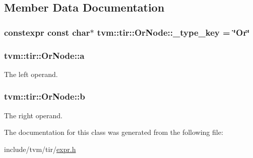 \subsection{Member Data Documentation}
\subsubsection[{\texorpdfstring{\+\_\+type\+\_\+key}{_type_key}}]{\setlength{\rightskip}{0pt plus 5cm}constexpr const char$\ast$ tvm\+::tir\+::\+Or\+Node\+::\+\_\+type\+\_\+key = \char`\"{}Or\char`\"{}\hspace{0.3cm}{\ttfamily [static]}}\hypertarget{classtvm_1_1tir_1_1OrNode_a9c0985de2d00800a2745ffda44b6e4a9}{}\label{classtvm_1_1tir_1_1OrNode_a9c0985de2d00800a2745ffda44b6e4a9}
\subsubsection[{\texorpdfstring{a}{a}}]{ tvm\+::tir\+::\+Or\+Node\+::a}\hypertarget{classtvm_1_1tir_1_1OrNode_a61302dc15e752bbde390bdba6c5de3a8}{}\label{classtvm_1_1tir_1_1OrNode_a61302dc15e752bbde390bdba6c5de3a8}


The left operand. 

\subsubsection[{\texorpdfstring{b}{b}}]{ tvm\+::tir\+::\+Or\+Node\+::b}\hypertarget{classtvm_1_1tir_1_1OrNode_a37326d054944087da18aca83cd3570e9}{}\label{classtvm_1_1tir_1_1OrNode_a37326d054944087da18aca83cd3570e9}


The right operand. 



The documentation for this class was generated from the following file\+:\begin{DoxyCompactItemize}
\item 
include/tvm/tir/\hyperlink{tir_2expr_8h}{expr.\+h}\end{DoxyCompactItemize}

